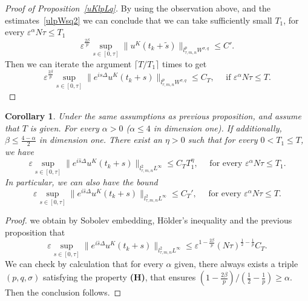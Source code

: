\documentclass[10pt,a4paper]{article}
\newtheorem{corollary}[theorem]{Corollary}
\begin{document}
\begin{proof}[Proof of Proposition~\ref{uKlpLq}]
    By using the observation above, and the estimates~\eqref{ulpWsq2} 
    we can conclude that we can take sufficiently small \(T_1\), for every
    \(\varepsilon^\alpha N\tau \leq T_1\) 
    \[ \varepsilon^{\frac{2\beta}p} \sup_{s\in[0,\tau]} \|u^K(t_k+\tilde{s})\|_{l^p_{\tau,m,n}W^{\sigma,q}} \leq C'.\]
    Then we can iterate the argument \( \lceil T/T_1 \rceil \) times to get
    \[ \varepsilon^{\frac{2\beta}p} \sup_{s\in[0,\tau]} \|e^{i\hat{s}\Delta}u^K(t_k+s)\|_{l^p_{\tau,m,n}W^{\sigma,q}}
      \leq C_T,\quad \text{ if } \varepsilon^\alpha N\tau \leq T. \]
  \end{proof}
  
  \begin{corollary}\label{uKl2Linfty}
    Under the same assumptions as previous proposition, and assume that \(T\) is
    given. For every \(\alpha > 0\) (\(\alpha\leq4\) in dimension one). If 
    additionally, \(\beta\leq\frac{4-\alpha}2\) in dimension one. There exist
    an \(\eta>0\) such that for every \(0< T_1 \leq T\), we have 
    \[ \varepsilon \sup_{s\in[0,\tau]} \|e^{i\hat{s}\Delta}u^K(t_k+s)\|_{l^2_{\tau,m,n}L^\infty} 
    \leq C_T T_1^\eta, \quad \text{ for every } \varepsilon^\alpha N \tau \leq T_1. \]
    In particular, we can also have the bound 
    \[ \varepsilon \sup_{s\in[0,\tau]} \|e^{i\hat{s}\Delta}u^K(t_k+s)\|_{l^2_{\tau,m,n}L^\infty} 
    \leq C_T', \quad \text{ for every } \varepsilon^\alpha N \tau \leq T. \]
  \end{corollary}

  \begin{proof}
    we obtain by Sobolev embedding, H\"older's inequality and the previous
    proposition that 
    \[ \varepsilon \sup_{s\in[0,\tau]} \|e^{i\hat{s}\Delta}u^K(t_k+s)\|_{l^2_{\tau,m,n}L^\infty}
    \leq \varepsilon^{1-\frac{2\beta}p} (N\tau)^{\frac12-\frac1p} C_T. \]
    We can check by calculation that for every \(\alpha\) given, there 
    always exists a triple \((p,q,\sigma)\) satisfying the property {\bf (H)}, 
    that ensures \((1-\frac{2\beta}p)/(\frac12-\frac1p) \geq \alpha\). Then the
    conclusion follows.
  \end{proof}
  
\end{document}
